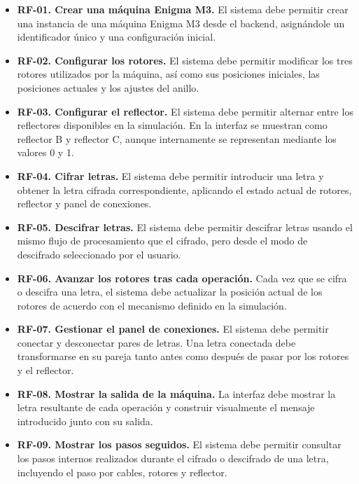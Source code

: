 \begin{itemize}
    \item \textbf{RF-01. Crear una máquina Enigma M3.} El sistema debe permitir crear una instancia de una máquina Enigma M3 desde el backend, asignándole un identificador único y una configuración inicial.

    \item \textbf{RF-02. Configurar los rotores.} El sistema debe permitir modificar los tres rotores utilizados por la máquina, así como sus posiciones iniciales, las posiciones actuales y los ajustes del anillo.

    \item \textbf{RF-03. Configurar el reflector.} El sistema debe permitir alternar entre los reflectores disponibles en la simulación. En la interfaz se muestran como reflector B y reflector C, aunque internamente se representan mediante los valores 0 y 1.

    \item \textbf{RF-04. Cifrar letras.} El sistema debe permitir introducir una letra y obtener la letra cifrada correspondiente, aplicando el estado actual de rotores, reflector y panel de conexiones.

    \item \textbf{RF-05. Descifrar letras.} El sistema debe permitir descifrar letras usando el mismo flujo de procesamiento que el cifrado, pero desde el modo de descifrado seleccionado por el usuario.

    \item \textbf{RF-06. Avanzar los rotores tras cada operación.} Cada vez que se cifra o descifra una letra, el sistema debe actualizar la posición actual de los rotores de acuerdo con el mecanismo definido en la simulación.

    \item \textbf{RF-07. Gestionar el panel de conexiones.} El sistema debe permitir conectar y desconectar pares de letras. Una letra conectada debe transformarse en su pareja tanto antes como después de pasar por los rotores y el reflector.

    \item \textbf{RF-08. Mostrar la salida de la máquina.} La interfaz debe mostrar la letra resultante de cada operación y construir visualmente el mensaje introducido junto con su salida.

    \item \textbf{RF-09. Mostrar los pasos seguidos.} El sistema debe permitir consultar los pasos internos realizados durante el cifrado o descifrado de una letra, incluyendo el paso por cables, rotores y reflector.


\end{itemize}
